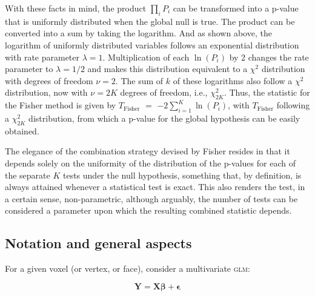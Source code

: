 With these facts in mind, the product $\prod_{i} P_{i}$ can be transformed into a p-value that is uniformly distributed when the global null is true. The product can be converted into a sum by taking the logarithm. And as shown above, the logarithm of uniformly distributed variables follows an exponential distribution with rate parameter $\lambda=1$. Multiplication of each $\ln(P_{i})$ by 2 changes the rate parameter to $\lambda=1/2$ and makes this distribution equivalent to a $\chi^{2}$ distribution with degrees of freedom $\nu=2$. The sum of $k$ of these logarithms also follow a $\chi^2$ distribution, now with $\nu=2K$ degrees of freedom, i.e., $\chi^{2}_{2K}$. Thus, the statistic for the Fisher method is given by $T_{\text{Fisher}}$ $=$ $-2 \sum_{i=1}^{K} \ln(P_{i})$, with $T_{\text{Fisher}}$ following a $\chi^{2}_{2K}$ distribution, from which a p-value for the global hypothesis can be easily obtained.

The elegance of the combination strategy devised by Fisher resides in that it depends solely on the uniformity of the distribution of the p-values for each of the separate $K$ tests under the null hypothesis, something that, by definition, is always attained whenever a statistical test is exact. This also renders the test, in a certain sense, non-parametric, although arguably, the number of tests can be considered a parameter upon which the resulting combined statistic depends.

\subsection{Notation and general aspects}
\label{sec:comb:notation}

For a given voxel (or vertex, or face), consider a multivariate \textsc{glm}:

\begin{equation}
\mathbf{Y} = \mathbf{X}\boldsymbol{\beta} + \boldsymbol{\epsilon}
\label{eqn:comb:glm}
\end{equation}

